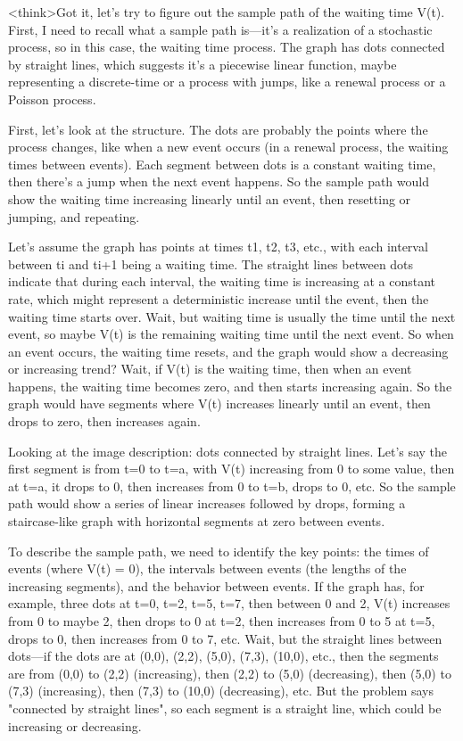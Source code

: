 <think>Got it, let's try to figure out the sample path of the waiting time V(t). First, I need to recall what a sample path is—it's a realization of a stochastic process, so in this case, the waiting time process. The graph has dots connected by straight lines, which suggests it's a piecewise linear function, maybe representing a discrete-time or a process with jumps, like a renewal process or a Poisson process.

First, let's look at the structure. The dots are probably the points where the process changes, like when a new event occurs (in a renewal process, the waiting times between events). Each segment between dots is a constant waiting time, then there's a jump when the next event happens. So the sample path would show the waiting time increasing linearly until an event, then resetting or jumping, and repeating.

Let's assume the graph has points at times t1, t2, t3, etc., with each interval between ti and ti+1 being a waiting time. The straight lines between dots indicate that during each interval, the waiting time is increasing at a constant rate, which might represent a deterministic increase until the event, then the waiting time starts over. Wait, but waiting time is usually the time until the next event, so maybe V(t) is the remaining waiting time until the next event. So when an event occurs, the waiting time resets, and the graph would show a decreasing or increasing trend? Wait, if V(t) is the waiting time, then when an event happens, the waiting time becomes zero, and then starts increasing again. So the graph would have segments where V(t) increases linearly until an event, then drops to zero, then increases again.

Looking at the image description: dots connected by straight lines. Let's say the first segment is from t=0 to t=a, with V(t) increasing from 0 to some value, then at t=a, it drops to 0, then increases from 0 to t=b, drops to 0, etc. So the sample path would show a series of linear increases followed by drops, forming a staircase-like graph with horizontal segments at zero between events.

To describe the sample path, we need to identify the key points: the times of events (where V(t) = 0), the intervals between events (the lengths of the increasing segments), and the behavior between events. If the graph has, for example, three dots at t=0, t=2, t=5, t=7, then between 0 and 2, V(t) increases from 0 to maybe 2, then drops to 0 at t=2, then increases from 0 to 5 at t=5, drops to 0, then increases from 0 to 7, etc. Wait, but the straight lines between dots—if the dots are at (0,0), (2,2), (5,0), (7,3), (10,0), etc., then the segments are from (0,0) to (2,2) (increasing), then (2,2) to (5,0) (decreasing), then (5,0) to (7,3) (increasing), then (7,3) to (10,0) (decreasing), etc. But the problem says "connected by straight lines", so each segment is a straight line, which could be increasing or decreasing.

